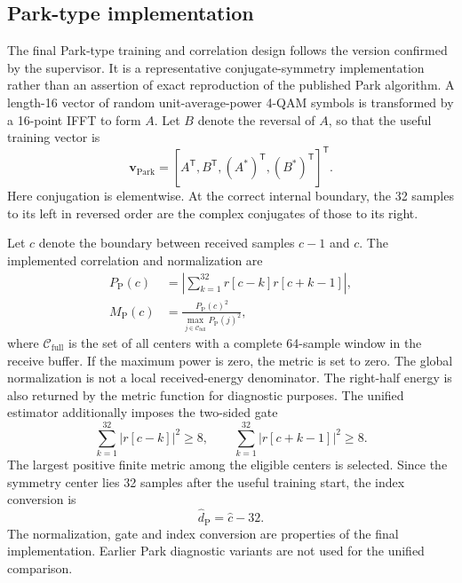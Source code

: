 \subsection{Park-type implementation}
The final Park-type training and correlation design follows the version confirmed by the supervisor. It is a representative conjugate-symmetry implementation rather than an assertion of exact reproduction of the published Park algorithm. A length-16 vector of random unit-average-power 4-QAM symbols is transformed by a 16-point IFFT to form $A$. Let $B$ denote the reversal of $A$, so that the useful training vector is
\begin{equation}
 \mathbf{v}_{\mathrm{Park}}=[A^{\mathsf T},B^{\mathsf T},
 (A^*)^{\mathsf T},(B^*)^{\mathsf T}]^{\mathsf T}.
\end{equation}
Here conjugation is elementwise. At the correct internal boundary, the 32 samples to its left in reversed order are the complex conjugates of those to its right.

Let $c$ denote the boundary between received samples $c-1$ and $c$. The implemented correlation and normalization are
\begin{align}
 P_{\mathrm{P}}(c)&=\left|\sum_{k=1}^{32}r[c-k]r[c+k-1]\right|,\\
 M_{\mathrm{P}}(c)&=\frac{P_{\mathrm{P}}(c)^2}
 {\max_{j\in\mathcal{C}_{\mathrm{full}}}P_{\mathrm{P}}(j)^2},
\end{align}
where $\mathcal{C}_{\mathrm{full}}$ is the set of all centers with a complete 64-sample window in the receive buffer. If the maximum power is zero, the metric is set to zero. The global normalization is not a local received-energy denominator. The right-half energy is also returned by the metric function for diagnostic purposes. The unified estimator additionally imposes the two-sided gate
\begin{equation}
 \sum_{k=1}^{32}|r[c-k]|^2\geq8,\qquad
 \sum_{k=1}^{32}|r[c+k-1]|^2\geq8.
\end{equation}
The largest positive finite metric among the eligible centers is selected. Since the symmetry center lies 32 samples after the useful training start, the index conversion is
\begin{equation}
 \hat d_{\mathrm{P}}=\hat c-32.
\end{equation}
The normalization, gate and index conversion are properties of the final implementation. Earlier Park diagnostic variants are not used for the unified comparison.

